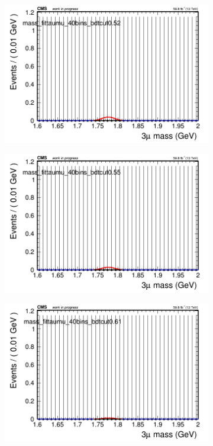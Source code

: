 \begin{figure}[H]
\begin{subfigure}{0.2\textwidth}
        \caption{}
    \end{subfigure}
    \begin{subfigure}{0.2\textwidth}
        \includegraphics[width=\textwidth]{flat_fit/plots/taumu/massfit_taumu_40bins_bdtcut0.52.png}
        \caption{}
    \end{subfigure}
    \begin{subfigure}{0.2\textwidth}
        \includegraphics[width=\textwidth]{flat_fit/plots/taumu/massfit_taumu_40bins_bdtcut0.55.png}
        \caption{}
    \end{subfigure}
    \begin{subfigure}{0.2\textwidth}
        \includegraphics[width=\textwidth]{flat_fit/plots/taumu/massfit_taumu_40bins_bdtcut0.61.png}

\end{subfigure}
\end{figure}
